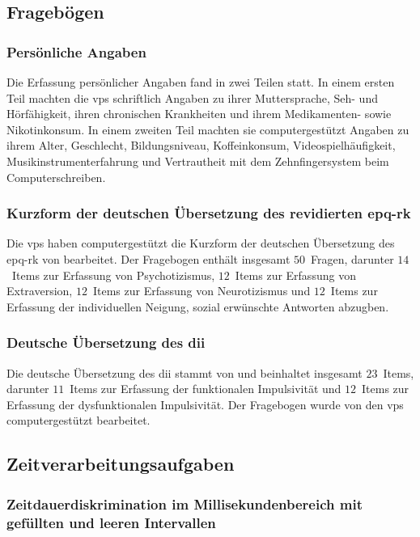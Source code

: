 \documentclass[11pt, twoside, a4paper]{book}		%
\begin{document}
\subsection{Fragebögen}

\subsubsection*{Persönliche Angaben}
Die Erfassung persönlicher Angaben fand in zwei Teilen statt. In einem ersten Teil machten die \glspl{vp} schriftlich Angaben zu ihrer Muttersprache, Seh- und Hörfähigkeit, ihren chronischen Krankheiten und ihrem Medikamenten- sowie Nikotinkonsum. In einem zweiten Teil machten sie computergestützt Angaben zu ihrem Alter, Geschlecht, Bildungsniveau, Koffeinkonsum,  Videospielhäufigkeit, Musikinstrumenterfahrung und Vertrautheit mit dem Zehnfingersystem beim Computerschreiben.


\subsubsection*{Kurzform der deutschen Übersetzung des revidierten \gls{epq-rk}}
Die \glspl{vp} haben  computergestützt die Kurzform der deutschen Übersetzung des \gls{epq-rk} von \citet{Ruch1999} bearbeitet. Der Fragebogen enthält insgesamt $50$~Fragen, darunter $14$~Items zur Erfassung von Psychotizismus, $12$~Items zur Erfassung von Extraversion, $12$~Items zur Erfassung von Neurotizismus und $12$~Items zur Erfassung der individuellen Neigung, sozial erwünschte Antworten abzugben.

\subsubsection*{Deutsche Übersetzung des \gls{dii}}
Die deutsche Übersetzung des \gls{dii} stammt von \citet{Kuhmann1996} und beinhaltet insgesamt $23$~Items, darunter $11$~Items zur Erfassung der funktionalen Impulsivität und  $12$~Items zur Erfassung der dysfunktionalen Impulsivität. Der Fragebogen wurde von den \glspl{vp} computergestützt bearbeitet.

\subsection{Zeitverarbeitungsaufgaben}


\subsubsection*{Zeitdauerdiskrimination im Millisekundenbereich mit gefüllten und leeren Intervallen}
\end{document}
